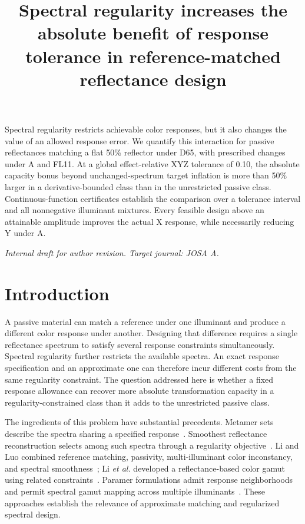 \documentclass{optica-article}
\begin{document}
\title{Spectral regularity increases the absolute benefit of response tolerance in reference-matched reflectance design}
\author{}
\address{}
\email{}
\begin{abstract*}
Spectral regularity restricts achievable color responses, but it also changes the value of an allowed response error. We quantify this interaction for passive reflectances matching a flat 50\% reflector under D65, with prescribed changes under A and FL11. At a global effect-relative XYZ tolerance of 0.10, the absolute capacity bonus beyond unchanged-spectrum target inflation is more than 50\% larger in a derivative-bounded class than in the unrestricted passive class. Continuous-function certificates establish the comparison over a tolerance interval and all nonnegative illuminant mixtures. Every feasible design above an attainable amplitude improves the actual X response, while necessarily reducing Y under A.
\end{abstract*}
\thispagestyle{plain}

\noindent\textit{Internal draft for author revision. Target journal: JOSA A.}

\section{Introduction}
A passive material can match a reference under one illuminant and produce a different color response under another. Designing that difference requires a single reflectance spectrum to satisfy several response constraints simultaneously. Spectral regularity further restricts the available spectra. An exact response specification and an approximate one can therefore incur different costs from the same regularity constraint. The question addressed here is whether a fixed response allowance can recover more absolute transformation capacity in a regularity-constrained class than it adds to the unrestricted passive class.

The ingredients of this problem have substantial precedents. Metamer sets describe the spectra sharing a specified response~\cite{Finlayson2005}. Smoothest reflectance reconstruction selects among such spectra through a regularity objective~\cite{vanTrigt1990,Burns2020}. Li and Luo combined reference matching, passivity, multi-illuminant color inconstancy, and spectral smoothness~\cite{Li2006}; Li \emph{et al.} developed a reflectance-based color gamut using related constraints~\cite{Li2007}. Paramer formulations admit response neighborhoods and permit spectral gamut mapping across multiple illuminants~\cite{Urban2011,Morovic2021}. These approaches establish the relevance of approximate matching and regularized spectral design.
\end{document}
